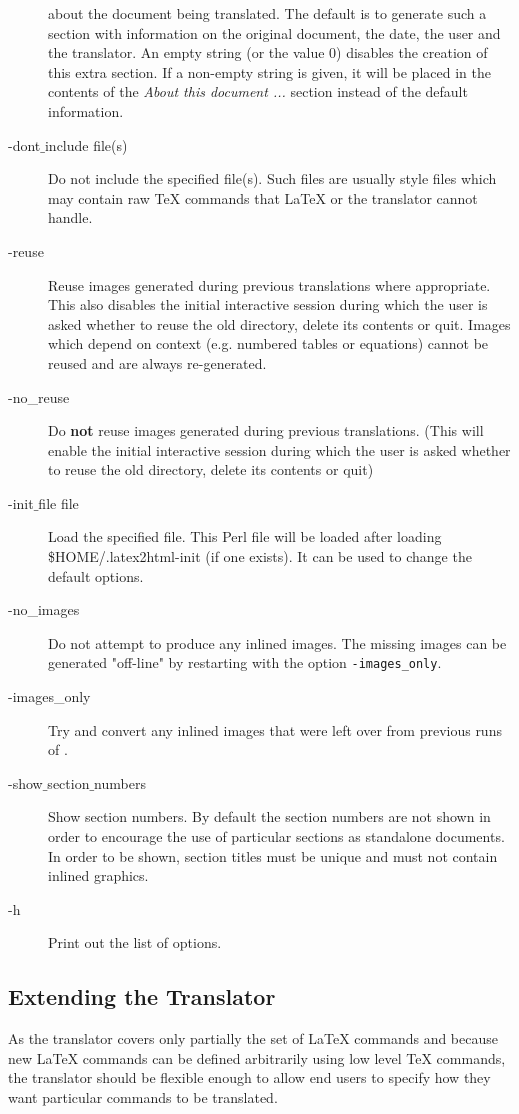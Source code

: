 \begin{description}
about the document being translated. The default is to generate such a section 
with information on the original document, the date, the user and the
translator.
An empty string (or the value 0) disables the creation of this extra
section. If a non-empty string is given, it will be placed in the contents of the 
{\em About this document ...} section instead of the default information.
\item [-dont$\_$include file(s)]
Do not include the specified file(s). Such files are usually style files which
may contain raw TeX commands that LaTeX or the translator cannot handle. 
\item [-reuse]
Reuse images generated during previous translations where appropriate.
This also disables the initial interactive session during which the user is
asked whether to reuse the old directory, delete its contents or quit.
Images which depend on context (e.g. numbered tables or equations)
cannot be reused and are always re-generated.
\item [-no\_reuse]
Do {\bf not} reuse images generated during previous translations.
(This will enable the initial interactive session during which the user is
asked whether to reuse the old directory, delete its contents or quit)
\item [-init$\_$file file]
Load the specified file. This Perl file will be loaded after loading 
\$HOME/.latex2html-init (if one exists). It can be used to change the 
default options.
\item [ -no\_images]
Do not attempt to produce any inlined images. 
The missing images can be generated "off-line" by restarting \latextohtml
with the option {\tt -images\_only}.
\item [ -images\_only]
Try and convert any inlined images that were left over from previous
runs of \latextohtml. 
\item [ -show$\_$section$\_$numbers]
Show section numbers. By default the section numbers are not shown 
in order to encourage the 
use of particular sections as standalone documents. 
In order to be shown, section titles must be unique and must not
contain inlined graphics.
\item [-h]
Print out the list of options.
\end{description}

\subsection{Extending the Translator}
\label{sec:extend}
As the translator covers only partially the set of LaTeX commands
and
because new LaTeX commands can be defined arbitrarily using low level 
TeX commands, the translator should be flexible enough to allow end
users
to specify how they want particular commands to be translated. 

